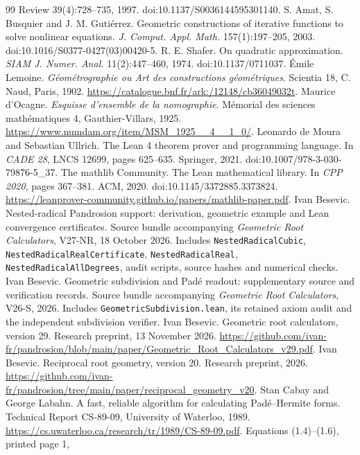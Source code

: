 \begin{thebibliography}{99}
{Review} 39(4):728--735, 1997. doi:10.1137/S0036144595301140.
 S. Amat, S. Busquier and J. M. Guti\'errez. Geometric constructions of iterative
functions to solve nonlinear equations. \emph{J. Comput. Appl. Math.} 157(1):197--205, 2003.
doi:10.1016/S0377-0427(03)00420-5.
 R. E. Shafer. On quadratic approximation. \emph{SIAM J. Numer. Anal.}
11(2):447--460, 1974. doi:10.1137/0711037.
 \'Emile Lemoine. \emph{G\'eom\'etrographie ou Art des constructions
g\'eom\'etriques}. Scientia 18, C. Naud, Paris, 1902.
\url{https://catalogue.bnf.fr/ark:/12148/cb36049032t}.
 Maurice d'Ocagne. \emph{Esquisse d'ensemble de la nomographie}. M\'emorial des
sciences math\'ematiques 4, Gauthier-Villars, 1925.
\url{https://www.numdam.org/item/MSM_1925__4__1_0/}.
 Leonardo de Moura and Sebastian Ullrich. The Lean 4 theorem prover and programming
language. In \emph{CADE 28}, LNCS 12699, pages 625--635. Springer, 2021.
doi:10.1007/978-3-030-79876-5\_37.
 The mathlib Community. The Lean mathematical library. In \emph{CPP 2020}, pages
367--381. ACM, 2020. doi:10.1145/3372885.3373824.
\url{https://leanprover-community.github.io/papers/mathlib-paper.pdf}.
 Ivan Besevic. Nested-radical Pandrosion support: derivation, geometric example and
Lean convergence certificates. Source bundle accompanying \emph{Geometric Root Calculators}, V27-NR,
18 October 2026. Includes \texttt{NestedRadicalCubic}, \texttt{NestedRadicalRealCertificate},
\texttt{NestedRadicalReal}, \texttt{NestedRadicalAllDegrees}, audit scripts, source hashes and
numerical checks.
 Ivan Besevic. Geometric subdivision and Pad\'e readout: supplementary source and
verification records. Source bundle accompanying \emph{Geometric Root Calculators}, V26-S, 2026.
Includes \texttt{GeometricSubdivision.lean}, its retained axiom audit and the independent subdivision
verifier.
 Ivan Besevic. Geometric root calculators, version 29. Research preprint, 13 November
2026. \url{https://github.com/ivan-fr/pandrosion/blob/main/paper/Geometric_Root_Calculators_v29.pdf}.
 Ivan Besevic. Reciprocal root geometry, version 20. Research preprint, 2026.
\url{https://github.com/ivan-fr/pandrosion/tree/main/paper/reciprocal_geometry_v20}.
 Stan Cabay and George Labahn. A fast, reliable algorithm for calculating
Pad\'e--Hermite forms. Technical Report CS-89-09, University of Waterloo, 1989.
\url{https://cs.uwaterloo.ca/research/tr/1989/CS-89-09.pdf}. Equations (1.4)--(1.6), printed page 1,

\end{thebibliography}

